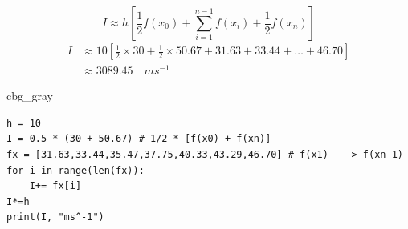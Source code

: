 \documentclass[%
oneside,                 %
final,                   %
10pt,french]{article}
\newenvironment{_cod_tight}[1]{
   \def\FrameCommand{\colorbox{#1}}
   \FrameRule0.6pt\MakeFramed {\FrameRestore}\vskip3mm}
   {\vskip0mm\endMakeFramed}
\newenvironment{cod}[1]{
\bgroup\rmfamily
\fboxsep=0mm\relax
\begin{_cod_tight}{#1}
\list{}{\parsep=-2mm\parskip=0mm\topsep=0pt\leftmargin=2mm
\rightmargin=2\leftmargin\leftmargin=4pt\relax}
\item\relax}
{\endlist\end{_cod_tight}\egroup}
\newenvironment{doconceexercise}{}{}
\begin{document}
\begin{doconceexercise}
\begin{equation*}
I \approx h \left[\frac{1}{2}f(x_0) + \sum_{i=1}^{n-1}f(x_i) + \frac{1}{2}f(x_n) \right]
\end{equation*}
\begin{align*}
I &\approx 10 \left[\frac{1}{2} \times 30 + \frac{1}{2} \times 50.67 + 31.63 + 33.44 + \ldots + 46.70 \right] \\
  &\approx 3089.45 \quad ms^{-1}
\end{align*}
\begin{cod}{cbg_gray}\begin{verbatim}
h = 10
I = 0.5 * (30 + 50.67) # 1/2 * [f(x0) + f(xn)]
fx = [31.63,33.44,35.47,37.75,40.33,43.29,46.70] # f(x1) ---> f(xn-1)
for i in range(len(fx)):
    I+= fx[i]
I*=h
print(I, "ms^-1")

\end{verbatim}
\end{cod}
\noindent




\end{doconceexercise}
\end{document}
